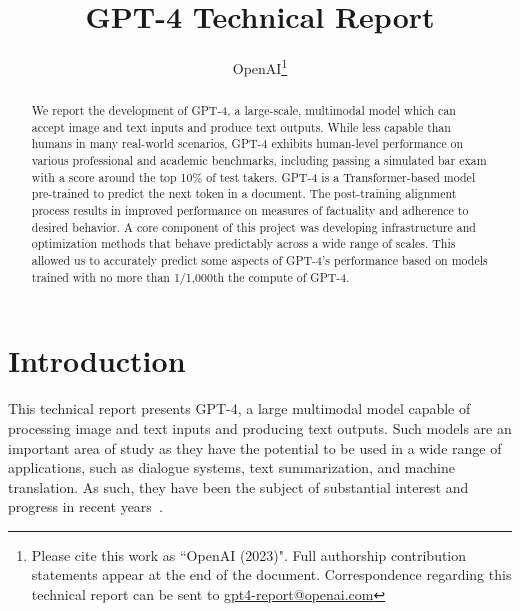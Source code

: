 \documentclass{article}
\title{GPT-4 Technical Report}
\author{OpenAI\thanks{Please cite this work as ``OpenAI (2023)". Full authorship contribution statements appear at the end of the document. Correspondence regarding this technical report can be sent to \url{gpt4-report@openai.com}}}
\newif\ifcomment
\begin{document}
\commenttrue %

\maketitle







\begin{abstract}
We report the development of GPT-4, a large-scale, multimodal model which can accept image and text inputs and produce text outputs. While less capable than humans in many real-world scenarios, GPT-4 exhibits human-level performance on various professional and academic benchmarks, including passing a simulated bar exam with a score around the top 10\% of test takers.
GPT-4 is a Transformer-based model pre-trained to predict the next token in a document.
The post-training alignment process results in improved performance on measures of factuality and adherence to desired behavior.
A core component of this project was developing infrastructure and optimization methods that behave predictably across a wide range of scales. This allowed us to accurately predict some aspects of GPT-4's performance based
on models trained with no more than 1/1,000th the compute of GPT-4.


\end{abstract}




\section{Introduction}

This technical report presents GPT-4, a large multimodal model capable of processing image and text inputs and producing text outputs. Such models are an important area of study as they have the potential to be used in a wide range of applications, such as dialogue systems, text summarization, and machine translation. As such, they have been the subject of substantial interest and progress in recent years~\citep{brown2020language,hoffmann2022training,chowdhery2022palm,rae2021scaling,dai2019transformer,liu2019roberta,devlin2018bert,raffel2019exploring,shazeer2018adafactor,ba2016layer,wei2022chain,huang2022selfimprovement,kojima2022zeroshotreasoner,kaplan2020scaling,henighan2020scaling,yang2022tensor,shazeer2017outrageously,zoph2022stmoe,wei2022emergent,dehghani2018universal,su2021roformer,alayracflamingo,chen2022pali,wang2021gpt,black2021gpt,scao2022bloom,zhang2022opt,touvron2023llama,radford2017sentiment,lample2019crosslingual,dao2022flashattention,child2019generating,rabe2021selfattention,Gray2017GPUKF}.%
\end{document}
